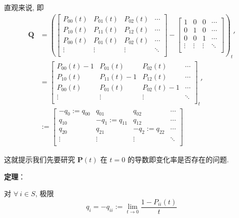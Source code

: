 \documentclass[openany]{ctexbook}
\theoremstyle{kaiti}
\theoremstyle{normal}
\begin{document}
直观来说, 即
\begin{equation}
  \begin{aligned}
    \bm{Q}
    &=
    \left(
      \begin{bmatrix}
        P_{00}(t) & P_{01}(t) & P_{02}(t) & \cdots \\
        P_{10}(t) & P_{11}(t) & P_{12}(t) & \cdots \\
        P_{00}(t) & P_{01}(t) & P_{02}(t) & \cdots \\
        \vdots & \vdots & \vdots & \ddots \\
      \end{bmatrix}
      -
      \begin{bmatrix}
        1 & 0 & 0 & \cdots \\
        0 & 1 & 0 & \cdots \\
        0 & 0 & 1 & \cdots \\
        \vdots & \vdots & \vdots & \ddots \\
      \end{bmatrix}
    \right)_t'\\
    &=
    \begin{bmatrix}
        P_{00}(t)-1 & P_{01}(t) & P_{02}(t) & \cdots \\
        P_{10}(t) & P_{11}(t)-1 & P_{12}(t) & \cdots \\
        P_{00}(t) & P_{01}(t) & P_{02}(t)-1 & \cdots \\
        \vdots & \vdots & \vdots & \ddots \\
      \end{bmatrix}_t'\\
    &:=
    \begin{bmatrix}
        -q_0:= q_{00} & q_{01} & q_{02} & \cdots \\
        q_{10} & -q_1:= q_{11} & q_{12} & \cdots \\
        q_{20} & q_{21} & -q_2:= q_{22} & \cdots \\
        \vdots & \vdots & \vdots & \ddots \\
    \end{bmatrix}
  \end{aligned}
\end{equation}

这就提示我们先要研究 $\bm{P}(t)$ 在 $t=0$ 的导数即变化率是否存在的问题.

\textbf{定理}：

对 $\forall~i\in S$, 极限
\begin{equation}
  q_i=-q_{ii}:=\lim_{t\to0}\frac{1-P_{ii}(t)}{t}
\end{equation}
\end{document}
